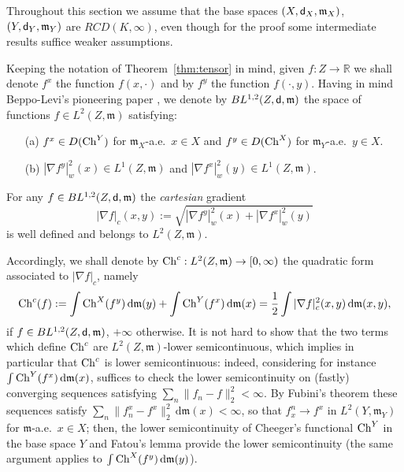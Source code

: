 \documentclass[reqno,11pt]{article}
\numberwithin{equation}{section}
\newcommand{\C}{\mathbb{C}}
\newcommand{\R}{\mathbb{R}}
\newcommand{\mm}{{\mbox{\boldmath$m$}}}
\newcommand{\sfd}{{\sf d}}
\renewcommand{\d}{{\mathrm d}}
\newcommand{\weakgrad}[1]{|\nabla #1|_w}                %
\newcommand{\cartgrad}[1]{|\nabla #1|_c}
\renewcommand{\C}{{\rm Ch}}
\newcommand{\rcd}[2]{RCD(#1,#2)}
\renewcommand{\mm}{\mathfrak m}
\begin{document}
Throughout this section we assume that the base spaces
$(X,\sfd_X,\mm_X)$, $(Y,\sfd_Y,\mm_Y)$ are $\rcd K\infty$, even
though for the proof some intermediate results suffice weaker
assumptions.

Keeping the notation of Theorem~\ref{thm:tensor} in mind, given
$f:Z\to\R$ we shall denote $f^x$ the function $f(x,\cdot)$ and by
$f^y$ the function $f(\cdot,y)$. Having in mind Beppo-Levi's
pioneering paper \cite{BeppoLevi}, we denote by
$BL^{1,2}(Z,\sfd,\mm)$ the space of functions $f\in L^2(Z,\mm)$
satisfying:
\begin{itemize}
\item[(a)] $f^x\in D(\C^Y)$ for $\mm_X$-a.e.~$x\in X$ and $f^y\in
D(\C^X)$ for $\mm_Y$-a.e.~$y\in X$.
\item[(b)] $\weakgrad{f^y}^2(x)\in L^1(Z,\mm)$ and $\weakgrad{f^x}^2(y)\in L^1(Z,\mm)$.
\end{itemize}
For any $f\in BL^{1,2}(Z,\sfd,\mm)$ the \emph{cartesian} gradient
$$
\cartgrad{f}(x,y):=\sqrt{\weakgrad{f^y}^2(x)+\weakgrad{f^x}^2(y)}
$$
is well defined and belongs to $L^2(Z,\mm)$.

Accordingly, we shall denote by $\C^c:L^2(Z,\mm)\to [0,\infty)$ the
quadratic form associated to $\cartgrad{f}$, namely
$$
\C^c (f):= \int\C^X(f^y)\,\d\mm(y)+\int\C^Y(f^x)\,\d\mm(x)=
\frac12\int \cartgrad{f}^2(x,y)\,\d\mm(x,y),
$$
if $f\in BL^{1,2}(Z,\sfd,\mm)$, $+\infty$ otherwise. It is not hard
to show that the two terms which define $\C^c$ are
$L^2(Z,\mm)$-lower semicontinuous, which implies in particular that
$\C^c$ is lower semicontinuous: indeed, considering for instance
$\int\C^Y(f^x)\,\d\mm(x)$, suffices to check the lower
semicontinuity on (fastly) converging sequences satisfying
$\sum_n\|f_n-f\|_2^2<\infty$. By Fubini's theorem these sequences
satisfy $\sum_n\|f_n^x-f^x\|_2^2\,\d\mm(x)<\infty$, so that
$f^n_x\to f^x$ in $L^2(Y,\mm_Y)$ for $\mm$-a.e.~$x\in X$; then, the
lower semicontinuity of Cheeger's functional $\C^Y$ in the base
space $Y$ and Fatou's lemma provide the lower semicontinuity (the
same argument applies to $\int\C^X(f^y)\,\d\mm(y)$).
\end{document}
